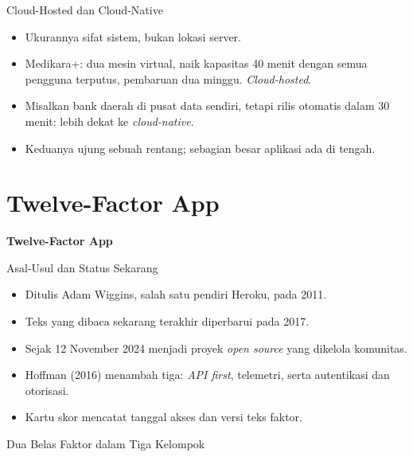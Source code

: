 \documentclass[aspectratio=169, table, 12pt]{beamer}
\begin{document}
\begin{frame}{{\Large Cloud-Hosted dan Cloud-Native}}
  \vspace{10pt}
  \begin{itemize}
    \item Ukurannya sifat sistem, bukan lokasi server.
    \item Medikara+: dua mesin virtual, naik kapasitas 40 menit dengan semua
          pengguna terputus, pembaruan dua minggu. \textit{Cloud-hosted}.
    \item Misalkan bank daerah di pusat data sendiri, tetapi rilis otomatis
          dalam 30 menit: lebih dekat ke \textit{cloud-native}.
    \item Keduanya ujung sebuah rentang; sebagian besar aplikasi ada di tengah.
  \end{itemize}
\end{frame}

\section{Twelve-Factor App}

\begin{frame}{\hfill}
  \centering
  \Huge{\textbf{Twelve-Factor App}}
\end{frame}

\begin{frame}{{\Large Asal-Usul dan Status Sekarang}}
  \vspace{10pt}
  \begin{itemize}
    \item Ditulis Adam Wiggins, salah satu pendiri Heroku, pada 2011.
    \item Teks yang dibaca sekarang terakhir diperbarui pada 2017.
    \item Sejak 12 November 2024 menjadi proyek \textit{open source} yang dikelola
          komunitas.
    \item Hoffman (2016) menambah tiga: \textit{API first}, telemetri, serta
          autentikasi dan otorisasi.
    \item Kartu skor mencatat tanggal akses dan versi teks faktor.
  \end{itemize}
\end{frame}

\begin{frame}{{\Large Dua Belas Faktor dalam Tiga Kelompok}}
  \centering
\end{frame}
\end{document}

